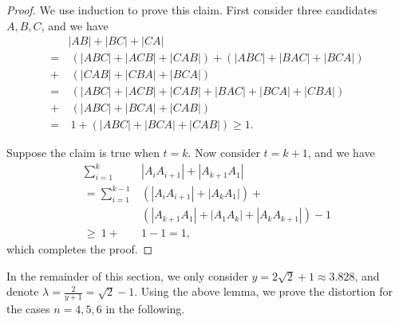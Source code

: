 \documentclass[11pt]{article}
\theoremstyle{remark}
\begin{document}
\begin{proof}
 We use induction to prove this claim. First consider three candidates $A,B,C$, and we have
 \begin{align*}
 & |AB|+|BC|+|CA| \\
 = &\ (|ABC|+|ACB|+|CAB|) + (|ABC|+|BAC|+|BCA|)\\
 + &\ (|CAB|+|CBA|+|BCA|) \\
 = &\ (|ABC|+|ACB|+|CAB|+|BAC|+|BCA|+|CBA|) \\
 + &\ (|ABC|+|BCA|+|CAB|) \\
 = &\ 1 + (|ABC|+|BCA|+|CAB|)
 \ge 1.
\end{align*}

Suppose the claim is true when $t=k$. Now consider $t=k+1$, and we have
 \begin{align*}
  \sum_{i = 1}^{k}&{|A_iA_{i+1}|}+|A_{k+1}A_1|\\
 =  \sum_{i = 1}^{k-1}&(|A_iA_{i+1}| + |A_{k}A_1|)+ \\
&(|A_{k+1}A_{1}| + |A_{1}A_{k}| +|A_kA_{k+1}|) - 1 \\
 \ge \ 1 + &1 - 1 = 1,
\end{align*}
which completes the proof.
\end{proof}

In the remainder of this section, we only consider $y=2\sqrt2+1 \approx 3.828$, and  denote $\lambda=\frac{2}{y+1}=\sqrt2-1$. Using the above lemma, we prove the distortion for the cases $n=4,5,6$ in the following.
\end{document}
